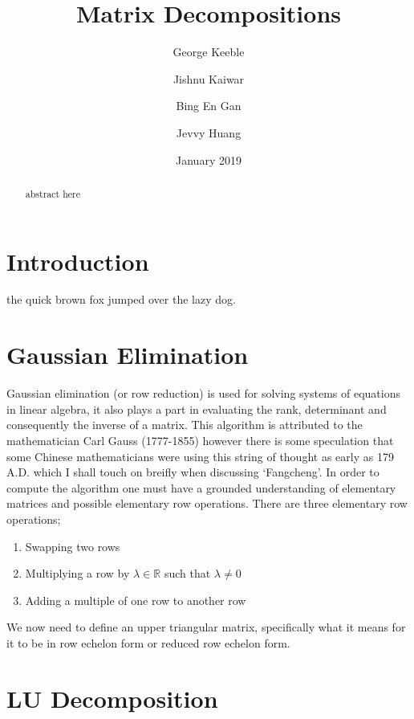 \documentclass[12pt,reqno,twoside,titlepage]{article}
\theoremstyle{definition}
\theoremstyle{theorem}
\begin{document}
\title{Matrix Decompositions}
\author{George Keeble
  \and
  Jishnu Kaiwar
  \and
  Bing En Gan
  \and
  Jevvy Huang
}
\date{January 2019}

\maketitle

\begin{abstract}
  abstract here
\end{abstract}

\section{Introduction}
\label{sec:int}
the quick brown fox jumped over the lazy dog.

\section{Gaussian Elimination}
\label{sec:gaus}

Gaussian elimination (or row reduction) is used for solving systems of equations in linear algebra, it also plays a part in evaluating the rank, determinant and consequently the inverse of a matrix.
This algorithm is attributed to the mathematician Carl Gauss (1777-1855) however there is some speculation that some Chinese mathematicians were using this string of thought as early as 179 A.D. which I shall touch on breifly when discussing ‘Fangcheng’.
In order to compute the algorithm one must have a grounded understanding of elementary matrices and possible elementary row operations.
There are three elementary row operations;

\begin{enumerate}
\item Swapping two rows
\item Multiplying a row by $\lambda \in \mathbb{R}$ such that $\lambda \ne 0$
\item Adding a multiple of one row to another row
\end{enumerate}

We now need to define an upper triangular matrix, specifically what it means for it to be in row echelon form or reduced row echelon form.

\section{LU Decomposition}
\label{sec:LUD}
\end{document}
